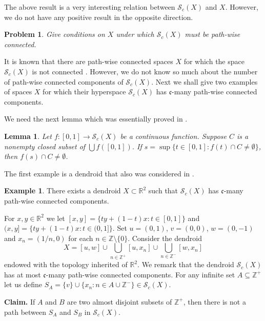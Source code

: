 \documentclass[11pt]{amsart}
\numberwithin{equation}{section}
\theoremstyle{plain}
\newtheorem{lemma}[equation]{Lemma}
\newtheorem{problem}[equation]{Problem}
\theoremstyle{definition}
\theoremstyle{definition}
\theoremstyle{definition}
\theoremstyle{definition}
\newtheorem{example}[equation]{Example}
\theoremstyle{definition}
\begin{document}
The above result is a very interesting relation between  $\mathcal{S}_c(X)$ and $X$. However,  we do not have  any positive result in the opposite direction.

\begin{problem}
Give conditions on $X$ under which $\mathcal{S}_c(X)$ must be path-wise connected.
\end{problem}

It is known that there are path-wise connected spaces $X$ for which the space $\mathcal{S}_c(X)$ is not connected \cite[Ex. 2.8]{sal-yas}. However, we do not know so much about the number of path-wise connected components  of $\mathcal{S}_c(X)$. Next we shall give two examples of spaces $X$ for which their hyperspace $\mathcal{S}_c(X)$ has $\mathfrak{c}$-many path-wise connected components.

\medskip

We need the next lemma which was essentially proved in \cite[Lemma 2.7]{sal-yas}.

\begin{lemma}\label{LYS}
Let $f : [0,1] \to \mathcal{S}_c(X)$ be a continuous function. Suppose $C$ is a nonempty closed subset of $\bigcup f([0, 1])$. If $s = \sup \{t \in [0, 1] : f(t) \cap C \not= \emptyset\}$, then $f(s) \cap C \not= \emptyset$.
\end{lemma}

The first example is a dendroid that also was considered in \cite[Example 4.7]{may-pat-rob}.

\begin{example}
There exists a dendroid $X \subset {\mathbb R}^2$ such that $\mathcal{S}_c(X)$ has $\mathfrak{c}$-many path-wise connected components.
\end{example}

\proof
 For $x, y \in {\mathbb R}^2$ we let $[x,y] = \{ty + (1-t)x : t \in [0,1]\}$ and $(x,y] = \{ty + (1-t)x : t \in (0,1]\}$. Set $u = (0,1)$, $v = (0,0)$, $w = (0,-1)$ and $x_n = (1/n,0)$ for each $n \in \mathbb{Z} \setminus \{0\}$. Consider the dendroid
$$X = [u,w] \cup \bigcup_{n \in {\mathbb{Z}^+}}[u,x_n] \cup \bigcup_{n \in {\mathbb{Z}^-}}[w,x_n]$$
endowed with the topology inherited of ${\mathbb R}^2$. We remark that  the dendroid $\mathcal{S}_c(X)$ has at most $\mathfrak{c}$-many path-wise connected components. For any infinite set $A \subseteq {\mathbb{Z}^+}$ let us define $S_A = \{v\} \cup\{x_n : n \in A \cup {\mathbb{Z}^-}\} \in \mathcal{S}_c(X)$.\medskip

\textbf{Claim.} If $A$ and $B$ are two almost disjoint subsets of ${\mathbb{Z}^+}$, then there is not a path between $S_A$ and $S_B$ in $\mathcal{S}_c(X)$.\medskip
\end{document}
